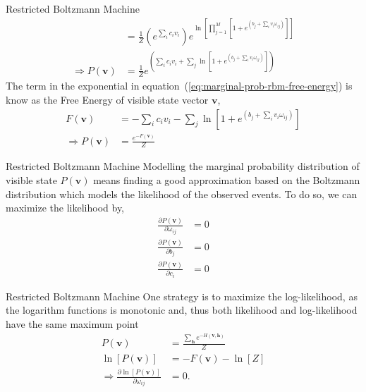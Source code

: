 \begin{frame}{Restricted Boltzmann Machine}
    \justifying%
    \begin{align}
        &= \frac{1}{Z} \left(e^{\sum_{i} c_{i} v_{i}}\right) e^{\ln\left[\prod_{j=1}^{M} \left[1 + e^{\left(b_{j} + \sum_{i} v_{i} \omega_{ij}\right)}\right] \right]} \nonumber \\
        \label{eq:marginal-prob-rbm-free-energy}
        \Rightarrow P(\mathbf{v}) &= \frac{1}{Z} e^{\left( \sum_{i} c_{i} v_{i} + \sum_{j} \ln\left[1 + e^{\left(b_{j} + \sum_{i} v_{i} \omega_{ij}\right)}\right] \right)} 
    \end{align}
    The term in the exponential in equation~(\ref{eq:marginal-prob-rbm-free-energy}) is know as the Free Energy of visible state vector $\mathbf{v}$,
    \begin{align}
        \label{eq:free-energy-rbm}
        F(\mathbf{v}) &= - \sum_{i} c_{i} v_{i} - \sum_{j} \ln\left[1 + e^{\left(b_{j} + \sum_{i} v_{i} \omega_{ij}\right)} \right] \\
        \Rightarrow P(\mathbf{v}) &= \frac{e^{-F(\mathbf{v})}}{Z}
    \end{align}
\end{frame}


\begin{frame}{Restricted Boltzmann Machine}
    \justifying%
    Modelling the marginal probability distribution of visible state $P(\mathbf{v})$ means finding a good approximation based on the Boltzmann distribution which models the likelihood of the observed events. To do so, we can maximize the likelihood by,
    \begin{align}
        \label{eq:max-likelihood-rbm}
        \frac{\partial P(\mathbf{v})}{\partial \omega_{ij}} &= 0 \\
        \frac{\partial P(\mathbf{v})}{\partial b_{j}} &= 0 \\
        \frac{\partial P(\mathbf{v})}{\partial c_{i}} &= 0
    \end{align}
\end{frame}











\begin{frame}{Restricted Boltzmann Machine}
    \justifying%
    One strategy is to maximize the log-likelihood, as the logarithm functions is monotonic and, thus both likelihood and log-likelihood have the same maximum point
    \begin{align}
        \label{eq:log-likelihood-rbm}
        P(\mathbf{v}) &= \frac{\sum_{\mathbf{h}} e^{-H(\mathbf{v}, \mathbf{h})}}{Z} \nonumber \\
        \ln\left[P(\mathbf{v})\right] &= -F(\mathbf{v}) - \ln[Z] \\
        \Rightarrow \frac{\partial \ln[P(\mathbf{v})]}{\partial \omega_{ij}} &= 0.
    \end{align}
\end{frame}






